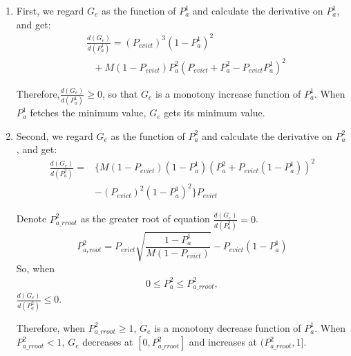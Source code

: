 \begin{enumerate}
\item
    First, we regard $G_e$ as the function of $P_{a}^{\mathfrak{1}}$ and calculate the derivative on $P_{a}^{\mathfrak{1}}$, and get:
    \begin{equation}
    \begin{aligned}
    &\frac{d(G_e)}{d(P_{a}^{\mathfrak{1}})} = (P_{evict})^{3}(1-P_{a}^{\mathfrak{1}})^2\\
    &\ \ \ +M(1-P_{evict})P_{a}^{\mathfrak{2}}(P_{evict}+P_{a}^{\mathfrak{2}}-P_{evict}P_{a}^{\mathfrak{1}})^{2}
    \end{aligned}
    \end{equation}

Therefore,$\frac{d(G_e)}{d(P_{a}^{\mathfrak{1}})} \geq 0$, so that $G_e$ is a monotony increase function of $P_{a}^{\mathfrak{1}}$.
When $P_{a}^{\mathfrak{1}}$ fetches the minimum value, $G_e$ gets its minimum value.

\item
Second, we regard $G_e$ as the function of $P_{a}^{\mathfrak{2}}$ and calculate the derivative on $P_{a}^{\mathfrak{2}}$, and get:
\begin{equation}
\begin{split}
\frac{d(G_e)}{d(P_{a}^{\mathfrak{2}})} = &\{M(1-P_{evict})(1-P_{a}^{\mathfrak{1}})(P_{a}^{\mathfrak{2}}+P_{evict}(1-P_{a}^{\mathfrak{1}}))^2\\
&-(P_{evict})^2(1-P_{a}^{\mathfrak{1}})^2 \}P_{evict}
\end{split}
\end{equation}

Denote $P_{a\_rroot}^{\mathfrak{2}}$ as the greater root of equation $\frac{d(G_e)}{d(P_{a}^{\mathfrak{2}})}=0$.
\begin{equation}
  P_{a_rroot}^{\mathfrak{2}} = P_{evict}\sqrt{\frac{1-P_{a}^{\mathfrak{1}}}{M(1-P_{evict})}}-P_{evict}(1-P_{a}^{\mathfrak{1}})
\end{equation}
So, when 
\begin{equation}
\begin{split}
0 \leq P_{a}^{\mathfrak{2}} \leq P_{a\_rroot}^{\mathfrak{2}},
\end{split}
\end{equation}
$\frac{d(G_e)}{d(P_{a}^{\mathfrak{2}})} \leq 0$.

Therefore, when $P_{a\_rroot}^{\mathfrak{2}} \geq 1$, $G_e$ is a monotony decrease function of $P_{a}^{\mathfrak{1}}$.
When $P_{a\_rroot}^{\mathfrak{2}} < 1$, $G_e$ decreases at $[0,P_{a\_rroot}^{\mathfrak{2}}]$ and increases at $(P_{a\_rroot}^{\mathfrak{2}},1]$.


\end{enumerate}
